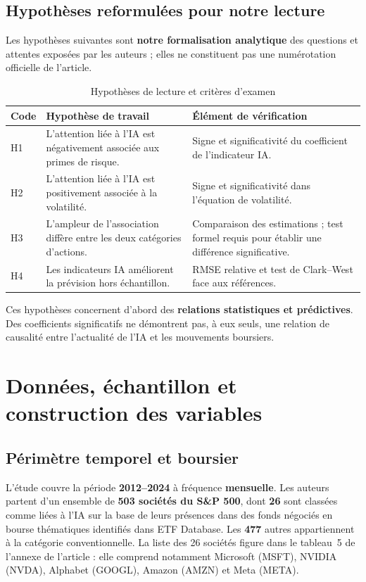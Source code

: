 \documentclass[11pt,a4paper]{article}
\begin{document}
\subsection{Hypothèses reformulées pour notre lecture}
Les hypothèses suivantes sont \textbf{notre formalisation analytique} des questions et attentes exposées par les auteurs ; elles ne constituent pas une numérotation officielle de l'article.
\begin{table}[H]
\centering\small
\caption{Hypothèses de lecture et critères d'examen}
\begin{tabularx}{\textwidth}{@{}p{0.95cm}X X@{}}
\toprule
\textbf{Code} & \textbf{Hypothèse de travail} & \textbf{Élément de vérification}\\
\midrule
H1 & L'attention liée à l'IA est négativement associée aux primes de risque. & Signe et significativité du coefficient de l'indicateur IA.\\
H2 & L'attention liée à l'IA est positivement associée à la volatilité. & Signe et significativité dans l'équation de volatilité.\\
H3 & L'ampleur de l'association diffère entre les deux catégories d'actions. & Comparaison des estimations ; test formel requis pour établir une différence significative.\\
H4 & Les indicateurs IA améliorent la prévision hors échantillon. & RMSE relative et test de Clark--West face aux références.\\
\bottomrule
\end{tabularx}
\end{table}

Ces hypothèses concernent d'abord des \textbf{relations statistiques et prédictives}. Des coefficients significatifs ne démontrent pas, à eux seuls, une relation de causalité entre l'actualité de l'IA et les mouvements boursiers.

\section{Données, échantillon et construction des variables}
\subsection{Périmètre temporel et boursier}
L'étude couvre la période \textbf{2012--2024} à fréquence \textbf{mensuelle}. Les auteurs partent d'un ensemble de \textbf{503 sociétés du S\&P 500}, dont \textbf{26} sont classées comme liées à l'IA sur la base de leurs présences dans des fonds négociés en bourse thématiques identifiés dans ETF Database. Les \textbf{477} autres appartiennent à la catégorie conventionnelle. La liste des 26 sociétés figure dans le tableau~5 de l'annexe de l'article : elle comprend notamment Microsoft (MSFT), NVIDIA (NVDA), Alphabet (GOOGL), Amazon (AMZN) et Meta (META).
\end{document}
